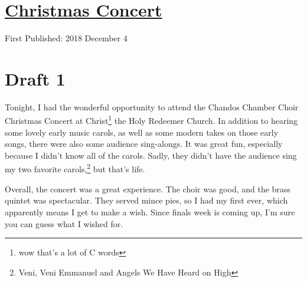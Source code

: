 \documentclass[12pt]{article}[titlepage]
\newcommand{\1}{\={a}}
\newcommand{\2}{\={e}}
\newcommand{\3}{\={\i}}
\newcommand{\4}{\=o}
\newcommand{\5}{\=u}
\newcommand{\6}{\={A}}
\renewcommand{\,}{\textsuperscript{,}}
\begin{document}
\doublespacing
\section{\href{christmas-concert.html}{Christmas Concert}}
First Published: 2018 December 4
\section{Draft 1}
Tonight, I had the wonderful opportunity to attend the Chandos Chamber Choir Christmas Concert at Christ\footnote{wow that's a lot of C words} the Holy Redeemer Church.
In addition to hearing some lovely early music carols, as well as some modern takes on those early songs, there were also some audience sing-alongs.
It was great fun, especially because I didn't know all of the carols.
Sadly, they didn't have the audience sing my two favorite carols,\footnote{Veni, Veni Emmanuel and Angels We Have Heard on High} but that's life.

Overall, the concert was a great experience.
The choir was good, and the brass quintet was spectacular.
They served mince pies, so I had my first ever, which apparently means I get to make a wish.
Since finals week is coming up, I'm sure you can guess what I wished for.
\end{document}
